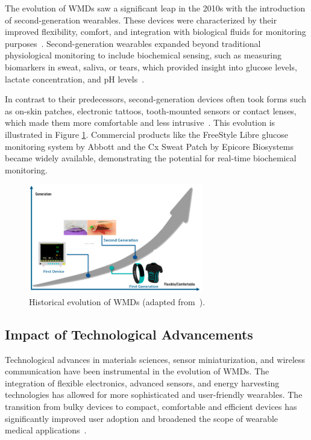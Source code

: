 \documentclass[journal]{IEEEtran}
\begin{document}
    The evolution of WMDs saw a significant leap in the 2010s with the introduction of second-generation wearables. These devices were characterized by their improved flexibility, comfort, and integration with biological fluids for monitoring purposes~\cite{Ates2022}. Second-generation wearables expanded beyond traditional physiological monitoring to include biochemical sensing, such as measuring biomarkers in sweat, saliva, or tears, which provided insight into glucose levels, lactate concentration, and pH levels~\cite{Luo2024}.

    In contrast to their predecessors, second-generation devices often took forms such as on-skin patches, electronic tattoos, tooth-mounted sensors or contact lenses, which made them more comfortable and less intrusive~\cite{Ates2022}. This evolution is illustrated in Figure \ref{fig:histoy}. Commercial products like the FreeStyle Libre glucose monitoring system by Abbott and the Cx Sweat Patch by Epicore Biosystems became widely available, demonstrating the potential for real-time biochemical monitoring.

    \begin{figure}[ht]
    \centering
    \includegraphics[width=3in]{Wearables_SEB_2024-2025_Group1/Figuras/history.jpeg}
    \caption{Historical evolution of WMDs (adapted from~\cite{Ates2022}).}
    \label{fig:histoy}
    \end{figure}

    \subsection{Impact of Technological Advancements}

    Technological advances in materials sciences, sensor miniaturization, and wireless communication have been instrumental in the evolution of WMDs. The integration of flexible electronics, advanced sensors, and energy harvesting technologies has allowed for more sophisticated and user-friendly wearables. The transition from bulky devices to compact, comfortable and efficient devices has significantly improved user adoption and broadened the scope of wearable medical applications~\cite{Ates2022}.
\end{document}
